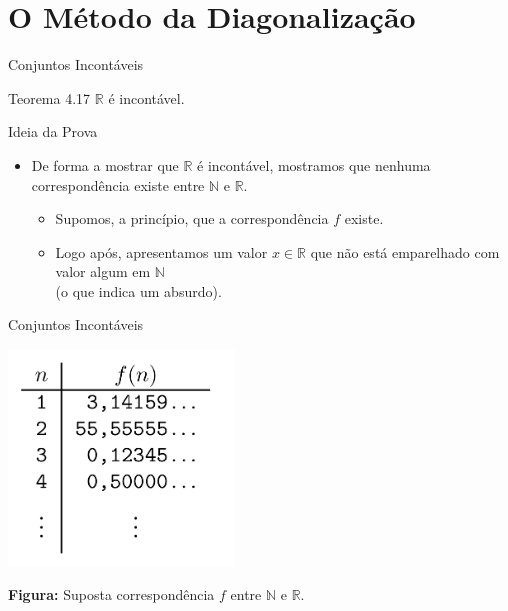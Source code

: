 \documentclass[xcolor=dvipsnames,table]{beamer}
\begin{document}
	\section{O Método da Diagonalização}
	\begin{frame}{Conjuntos Incontáveis}
		\begin{block}{Teorema 4.17}
			$\mathbb{R}$ é incontável.
		\end{block} \pause
		\begin{block}{Ideia da Prova}
			\begin{itemize}
				\item De forma a mostrar que $\mathbb{R}$ é incontável, mostramos que nenhuma correspondência existe entre $\mathbb{N}$ e $\mathbb{R}$.
				\begin{itemize}
					\item Supomos, a princípio, que a correspondência $f$ existe.
					\item Logo após, apresentamos um valor $x \in \mathbb{R}$ que não está emparelhado com valor algum em $\mathbb{N}$ \\(o que indica um absurdo).				
				\end{itemize}
			\end{itemize}
		\end{block}
	\end{frame}
	
	\begin{frame}{Conjuntos Incontáveis}
		\begin{center}
    		\includegraphics[width=6cm]{images/fHip.png}
    		
    		{\bf Figura:} Suposta correspondência $f$ entre $\mathbb{N}$ e $\mathbb{R}$.
  		\end{center}
	\end{frame}
	
\end{document}
